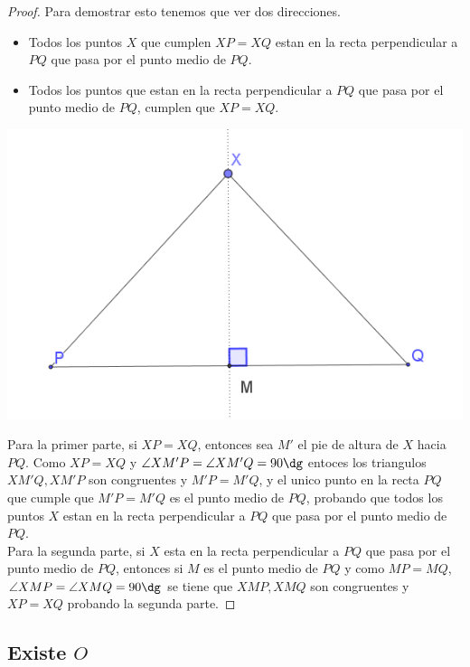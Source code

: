 \documentclass[11pt]{scrartcl}
\begin{document}
\begin{proof}
    Para demostrar esto tenemos que ver dos direcciones.
    \begin{itemize}
        \item Todos los puntos $X$ que cumplen $XP=XQ$ estan en la recta perpendicular a $PQ$ que pasa por el punto medio de $PQ$.
        \item Todos los puntos que estan en la recta perpendicular a $PQ$ que pasa por el punto medio de $PQ$, cumplen que $XP=XQ$.
    \end{itemize}

    \begin{center}
        \includegraphics[scale=0.7]{PNAC4.png}
    \end{center}

    Para la primer parte, si $XP=XQ$, entonces sea $M'$ el pie de altura de $X$ hacia $PQ$.
    Como $XP=XQ$ y $\angle XM'P=\angle XM'Q=90\dg$ entoces los triangulos $XM'Q, XM'P$ son congruentes y $M'P=M'Q$, y el unico punto en la recta $PQ$ que cumple
    que $M'P=M'Q$ es el punto medio de $PQ$, probando que todos los puntos $X$ estan en la recta perpendicular a $PQ$ que pasa por el punto medio de $PQ$. \\


    Para la segunda parte, si $X$ esta en la recta perpendicular a $PQ$ que pasa por el punto medio de $PQ$, entonces si $M$ es el punto medio de $PQ$ 
    y como $MP=MQ$, $\angle XMP=\angle XMQ= 90\dg$ se tiene que $XMP, XMQ$ son congruentes y $XP=XQ$ probando la segunda parte. 

\end{proof}

\subsection{Existe $O$}
\end{document}
